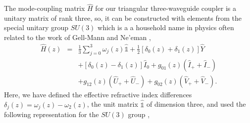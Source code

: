 \documentclass[9pt,twocolumn,twoside]{osajnl}
\begin{document}
The mode-coupling matrix $\hat{H}$ for our triangular three-waveguide coupler is a unitary matrix of rank three, so, it can be constructed with elements from the special unitary group $SU(3)$ which is a a household name in physics often related to the work of Gell-Mann \cite{GellMann1961} and Ne'eman \cite{Neeman1961p222},
\begin{eqnarray}
	\hat{H}(z) &=& \frac{1}{3} \sum_{j=0}^{3} \omega_{j}(z) \hat{\mathbb{1}} + \frac{1}{2} \left[ \delta_{0}(z) + \delta_{1}(z) \right] \hat{Y} \nonumber \\
	&& + \left[ \delta_{0}(z) - \delta_{1}(z) \right] \hat{I}_{0} + g_{01}(z) \left( \hat{I}_{+} + \hat{I}_{-} \right) \nonumber \\
	&& + g_{12}(z) \left( \hat{U}_{+} + \hat{U}_{-} \right) +  g_{02}(z) \left( \hat{V}_{+} + \hat{V}_{-} \right). \label{eq:MCMatrix}
\end{eqnarray}
Here, we have defined the effective refractive index differences $\delta_{j}(z) = \omega_{j}(z) - \omega_{2}(z)$, the unit matrix $\hat{\mathbb{1}}$ of dimension three, and used the following representation for the $SU(3)$ group \cite{Ticciati1999}, 
\end{document}
